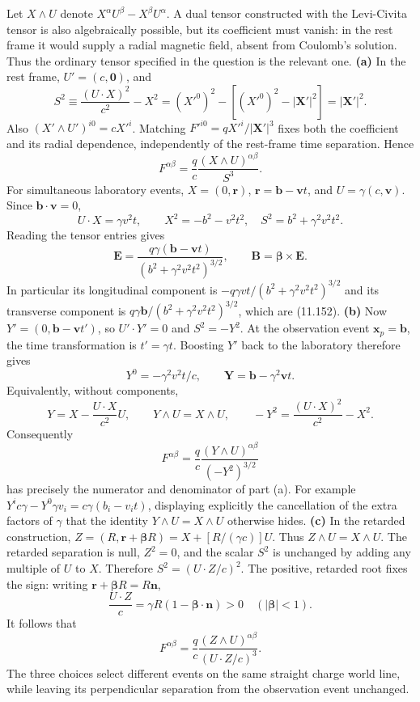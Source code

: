 \solution
Let $X\wedge U$ denote $X^\alpha U^\beta-X^\beta U^\alpha$.
A dual tensor constructed with the Levi-Civita tensor is also
algebraically possible, but its coefficient must vanish: in the
rest frame it would supply a radial magnetic field, absent from
Coulomb's solution. Thus the ordinary tensor specified in the
question is the relevant one.
\textbf{(a)} In the rest frame, $U'=(c,\mathbf0)$, and
\[
S^2\equiv\frac{(U\cdot X)^2}{c^2}-X^2
=(X'^0)^2-[(X'^0)^2-|\mathbf X'|^2]=|\mathbf X'|^2.
\]
Also $(X'\wedge U')^{i0}=cX'^i$. Matching
$F'^{i0}=qX'^i/|\mathbf X'|^3$ fixes both the coefficient and
its radial dependence, independently of the rest-frame time
separation. Hence
\[
\boxed{F^{\alpha\beta}=\frac qc\frac{(X\wedge U)^{\alpha\beta}}{S^3}.}
\]
For simultaneous laboratory events,
$X=(0,\mathbf r)$, $\mathbf r=\mathbf b-\mathbf vt$, and
$U=\gamma(c,\mathbf v)$. Since $\mathbf b\cdot\mathbf v=0$,
\[
U\cdot X=\gamma v^2t,\qquad X^2=-b^2-v^2t^2,
\quad S^2=b^2+\gamma^2v^2t^2.
\]
Reading the tensor entries gives
\[
\boxed{\mathbf E=\frac{q\gamma(\mathbf b-\mathbf vt)}
{(b^2+\gamma^2v^2t^2)^{3/2}},\qquad
\mathbf B=\boldsymbol\beta\times\mathbf E.}
\]
In particular its longitudinal component is
$-q\gamma vt/(b^2+\gamma^2v^2t^2)^{3/2}$ and its transverse
component is $q\gamma\mathbf b/(b^2+\gamma^2v^2t^2)^{3/2}$,
which are (11.152).
\textbf{(b)} Now $Y'=(0,\mathbf b-\mathbf vt')$, so
$U'\cdot Y'=0$ and $S^2=-Y^2$. At the observation event
$\mathbf x_p=\mathbf b$, the time transformation is $t'=\gamma t$.
Boosting $Y'$ back to the laboratory therefore gives
\[
Y^0=-\gamma^2v^2t/c,\qquad
\mathbf Y=\mathbf b-\gamma^2\mathbf vt.
\]
Equivalently, without components,
\[
Y=X-\frac{U\cdot X}{c^2}U,\qquad
Y\wedge U=X\wedge U,\qquad
-Y^2=\frac{(U\cdot X)^2}{c^2}-X^2.
\]
Consequently
\[
\boxed{F^{\alpha\beta}=\frac qc
\frac{(Y\wedge U)^{\alpha\beta}}{(-Y^2)^{3/2}}}
\]
has precisely the numerator and denominator of part (a).
For example $Y^ic\gamma-Y^0\gamma v_i
=c\gamma(b_i-v_it)$, displaying explicitly the cancellation of the extra factors of
$\gamma$ that the identity $Y\wedge U=X\wedge U$ otherwise hides.
\textbf{(c)} In the retarded construction,
$Z=(R,\mathbf r+\boldsymbol\beta R)=X+[R/(\gamma c)]U$.
Thus $Z\wedge U=X\wedge U$. The retarded separation is null,
$Z^2=0$, and the scalar $S^2$ is unchanged by adding any multiple
of $U$ to $X$. Therefore $S^2=(U\cdot Z/c)^2$.
The positive, retarded root fixes the sign: writing
$\mathbf r+\boldsymbol\beta R=R\mathbf n$,
\[
\frac{U\cdot Z}{c}=\gamma R(1-\boldsymbol\beta\cdot\mathbf n)>0
\quad (|\boldsymbol\beta|<1).
\]
It follows that
\[
\boxed{F^{\alpha\beta}=\frac qc
\frac{(Z\wedge U)^{\alpha\beta}}{(U\cdot Z/c)^3}.}
\]
The three choices select different events on the same straight
charge world line, while leaving its perpendicular separation
from the observation event unchanged.

